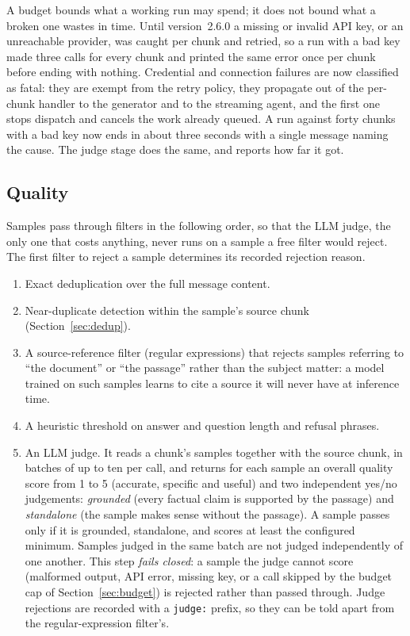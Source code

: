 \documentclass[11pt]{article}
\begin{document}
A budget bounds what a working run may spend; it does not bound what a
broken one wastes in time. Until version~2.6.0 a missing or invalid API
key, or an unreachable provider, was caught per chunk and retried, so a
run with a bad key made three calls for every chunk and printed the same
error once per chunk before ending with nothing. Credential and
connection failures are now classified as fatal: they are exempt from the
retry policy, they propagate out of the per-chunk handler to the
generator and to the streaming agent, and the first one stops dispatch
and cancels the work already queued. A run against forty chunks with a
bad key now ends in about three seconds with a single message naming the
cause. The judge stage does the same, and reports how far it got.

\subsection{Quality}
\label{sec:quality}
Samples pass through filters in the following order, so that the LLM
judge, the only one that costs anything, never runs on a sample a free
filter would reject. The first filter to reject a sample determines its
recorded rejection reason.

\begin{enumerate}[leftmargin=1.5em]
  \item Exact deduplication over the full message content.
  \item Near-duplicate detection within the sample's source chunk
    (Section~\ref{sec:dedup}).
  \item A source-reference filter (regular expressions) that rejects
    samples referring to ``the document'' or ``the passage'' rather than
    the subject matter: a model trained on such samples learns to cite a
    source it will never have at inference time.
  \item A heuristic threshold on answer and question length and refusal
    phrases.
  \item An LLM judge. It reads a chunk's samples together with the source
    chunk, in batches of up to ten per call, and returns for each sample
    an overall quality score from 1 to 5 (accurate, specific and useful)
    and two independent yes/no judgements: \emph{grounded} (every factual
    claim is supported by the passage) and \emph{standalone} (the sample
    makes sense without the passage). A sample passes only if it is
    grounded, standalone, and scores at least the configured minimum.
    Samples judged in the same batch are not judged independently of one
    another. This step \emph{fails closed}: a sample the judge cannot score
    (malformed output, API error, missing key, or a call skipped by the
    budget cap of Section~\ref{sec:budget}) is rejected rather than passed
    through. Judge rejections are recorded with a \texttt{judge:} prefix,
    so they can be told apart from the regular-expression filter's.
\end{enumerate}
\end{document}
